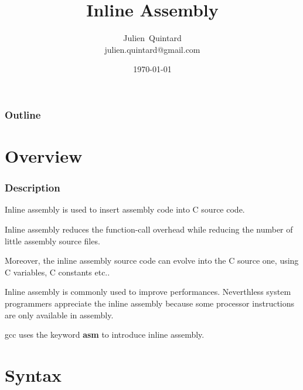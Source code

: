 \documentclass[9pt]{beamer}
\title{Inline Assembly}
\author
{
  Julien~Quintard\inst{1} \\
  {\tiny julien.quintard@gmail.com}
}
\institute
{
  \inst{1} kaneton distributed operating system project
}
\date{\today}
\newcommand{\nl}[0]{\vspace{0.4cm}}
\begin{document}
%
%

\begin{frame}
  \titlepage

  \begin{center}
     \hspace{0.1cm}  \hspace{0.1cm}
     \hspace{0.1cm}
  \end{center}
\end{frame}

%
%

\begin{frame}
  \frametitle{Outline}
  \tableofcontents
\end{frame}

%
%

\section{Overview}


\begin{frame}
  \frametitle{Description}

  Inline assembly is used to insert assembly code into C source code.

  \nl

  Inline assembly reduces the function-call overhead while reducing
  the number of little assembly source files.

  \nl

  Moreover, the inline assembly source code can evolve into the C
  source one, using C variables, C constants etc..

  \nl

  Inline assembly is commonly used to improve performances. Neverthless
  system programmers appreciate the inline assembly because some
  processor instructions are only available in assembly.

  \nl

  gcc uses the keyword \textbf{asm} to introduce inline assembly.
\end{frame}

%
%

\section{Syntax}

\end{document}
